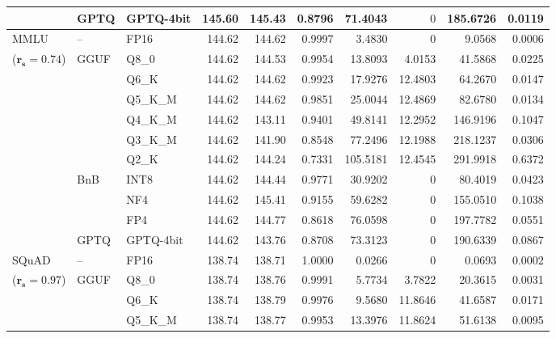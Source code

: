 \begin{longtable}{ll l rrrrrrr}
 & GPTQ & GPTQ-4bit & 145.60 & 145.43 & \cellcolor{red!18} 0.8796 & \cellcolor{red!18} 71.4043 & \cellcolor{cyan!12} $0$ & \cellcolor{red!18} 185.6726 & \cellcolor{red!18} 0.0119 \\
\midrule
MMLU & -- & FP16 & 144.62 & 144.62 & 0.9997 & 3.4830 & \cellcolor{cyan!12} $0$ & 9.0568 & 0.0006 \\
{\small ($\mathbf{r_s{=}0.74}$)} & GGUF & Q8\_0 & 144.62 & 144.53 & 0.9954 & 13.8093 & 4.0153 & 41.5868 & 0.0225 \\
 &  & Q6\_K & 144.62 & 144.62 & 0.9923 & 17.9276 & 12.4803 & 64.2670 & 0.0147 \\
 &  & Q5\_K\_M & 144.62 & 144.62 & 0.9851 & 25.0044 & 12.4869 & 82.6780 & 0.0134 \\
 &  & Q4\_K\_M & 144.62 & 143.11 & \cellcolor{red!18} 0.9401 & \cellcolor{red!18} 49.8141 & 12.2952 & \cellcolor{red!18} 146.9196 & \cellcolor{red!18} 0.1047 \\
 &  & Q3\_K\_M & 144.62 & 141.90 & \cellcolor{red!18} 0.8548 & \cellcolor{red!18} 77.2496 & 12.1988 & \cellcolor{red!18} 218.1237 & \cellcolor{red!18} 0.0306 \\
 &  & Q2\_K & 144.62 & 144.24 & \cellcolor{red!35} 0.7331 & \cellcolor{red!35} 105.5181 & 12.4545 & \cellcolor{red!35} 291.9918 & \cellcolor{red!35} 0.6372 \\
 & BnB & INT8 & 144.62 & 144.44 & 0.9771 & 30.9202 & \cellcolor{cyan!12} $0$ & 80.4019 & 0.0423 \\
 &  & NF4 & 144.62 & 145.41 & \cellcolor{red!18} 0.9155 & \cellcolor{red!18} 59.6282 & \cellcolor{cyan!12} $0$ & \cellcolor{red!18} 155.0510 & \cellcolor{red!18} 0.1038 \\
 &  & FP4 & 144.62 & 144.77 & \cellcolor{red!18} 0.8618 & \cellcolor{red!18} 76.0598 & \cellcolor{cyan!12} $0$ & \cellcolor{red!18} 197.7782 & \cellcolor{red!18} 0.0551 \\
 & GPTQ & GPTQ-4bit & 144.62 & 143.76 & \cellcolor{red!18} 0.8708 & \cellcolor{red!18} 73.3123 & \cellcolor{cyan!12} $0$ & \cellcolor{red!18} 190.6339 & \cellcolor{red!18} 0.0867 \\
\midrule
SQuAD & -- & FP16 & 138.74 & 138.71 & 1.0000 & 0.0266 & \cellcolor{cyan!12} $0$ & 0.0693 & 0.0002 \\
{\small ($\mathbf{r_s{=}0.97}$)} & GGUF & Q8\_0 & 138.74 & 138.76 & 0.9991 & 5.7734 & 3.7822 & 20.3615 & 0.0031 \\
 &  & Q6\_K & 138.74 & 138.79 & 0.9976 & 9.5680 & 11.8646 & 41.6587 & 0.0171 \\
 &  & Q5\_K\_M & 138.74 & 138.77 & 0.9953 & 13.3976 & 11.8624 & 51.6138 & 0.0095 \\

\end{longtable}
